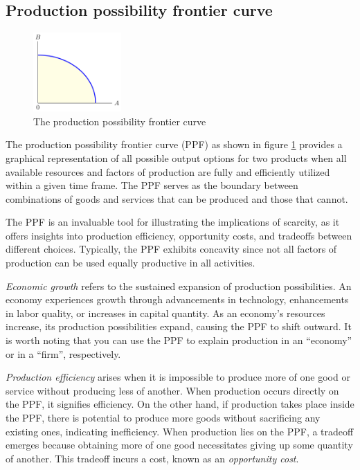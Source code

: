 \documentclass[
  12pt,
  oneside]{book}
\theoremstyle{definition}
\theoremstyle{definition}
\theoremstyle{definition}
\theoremstyle{definition}
\theoremstyle{remark}
\begin{document}
\hypertarget{production-possibility-frontier-curve}{%
\subsection{Production possibility frontier curve}\label{production-possibility-frontier-curve}}

\begin{figure}
\centering
\includegraphics[width=0.3\textwidth,height=\textheight]{fig/ppf1.png}
\caption{\label{fig:ppf} The production possibility frontier curve}
\end{figure}

The production possibility frontier curve (PPF) as shown in figure \ref{fig:ppf} provides a graphical representation of all possible output options for two products when all available resources and factors of production are fully and efficiently utilized within a given time frame. The PPF serves as the boundary between combinations of goods and services that can be produced and those that cannot.

The PPF is an invaluable tool for illustrating the implications of scarcity, as it offers insights into production efficiency, opportunity costs, and tradeoffs between different choices. Typically, the PPF exhibits concavity since not all factors of production can be used equally productive in all activities.

\emph{Economic growth} refers to the sustained expansion of production possibilities. An economy experiences growth through advancements in technology, enhancements in labor quality, or increases in capital quantity. As an economy's resources increase, its production possibilities expand, causing the PPF to shift outward. It is worth noting that you can use the PPF to explain production in an ``economy'' or in a ``firm'', respectively.

\emph{Production efficiency} arises when it is impossible to produce more of one good or service without producing less of another. When production occurs directly on the PPF, it signifies efficiency. On the other hand, if production takes place inside the PPF, there is potential to produce more goods without sacrificing any existing ones, indicating inefficiency. When production lies on the PPF, a tradeoff emerges because obtaining more of one good necessitates giving up some quantity of another. This tradeoff incurs a cost, known as an \emph{opportunity cost}.
\end{document}
